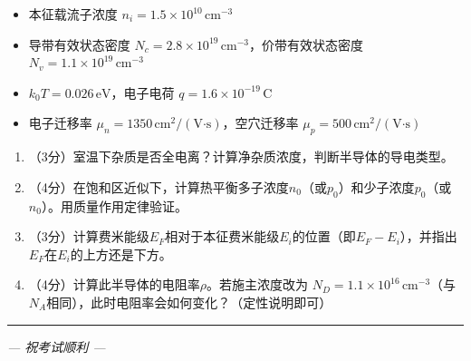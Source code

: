 \documentclass[12pt,a4paper]{ctexart}
\newcommand{\选择题}{\stepcounter{qcounter}\arabic{qcounter}.\,}
\newcommand{\填空题}{\stepcounter{qcounter}\arabic{qcounter}.\,}
\begin{document}
\begin{itemize}[nosep]
\item 本征载流子浓度 $n_i = 1.5 \times 10^{10}\,\text{cm}^{-3}$
\item 导带有效状态密度 $N_c = 2.8 \times 10^{19}\,\text{cm}^{-3}$，价带有效状态密度 $N_v = 1.1 \times 10^{19}\,\text{cm}^{-3}$
\item $k_0T = 0.026\,\text{eV}$，电子电荷 $q = 1.6 \times 10^{-19}\,\text{C}$
\item 电子迁移率 $\mu_n = 1350\,\text{cm}^2/(\text{V·s})$，空穴迁移率 $\mu_p = 500\,\text{cm}^2/(\text{V·s})$
\end{itemize}

\begin{enumerate}[label=(\arabic*),nosep,leftmargin=0em]
\item （3分）室温下杂质是否全电离？计算净杂质浓度，判断半导体的导电类型。
\item （4分）在饱和区近似下，计算热平衡多子浓度$n_0$（或$p_0$）和少子浓度$p_0$（或$n_0$）。用质量作用定律验证。
\item （3分）计算费米能级$E_F$相对于本征费米能级$E_i$的位置（即$E_F - E_i$），并指出$E_F$在$E_i$的上方还是下方。
\item （4分）计算此半导体的电阻率$\rho$。若施主浓度改为 $N_D = 1.1 \times 10^{16}\,\text{cm}^{-3}$（与$N_A$相同），此时电阻率会如何变化？（定性说明即可）
\end{enumerate}

\vspace{18cm}

\hrule
\vspace{8pt}

\begin{center}
\textit{--- 祝考试顺利 ---}
\end{center}
\end{document}

